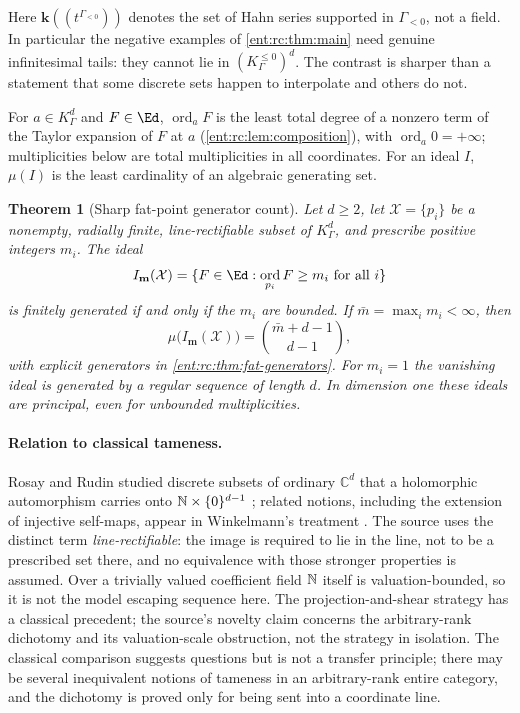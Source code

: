 \documentclass[11pt]{article}
\newtheorem{theorem}{Theorem}[section]
\theoremstyle{plain}
\theoremstyle{plain}
\theoremstyle{plain}
\theoremstyle{definition}
\theoremstyle{definition}
\theoremstyle{definition}
\theoremstyle{definition}
\theoremstyle{remark}
\newcommand{\C}{\mathbb C}\newcommand{\R}{\mathbb R}
\newcommand{\K}{K_\Gamma}\newcommand{\KD}{K_\Delta}
\DeclareMathOperator{\ord}{ord}\DeclareMathOperator{\cf}{cf}
\newcommand{\kk}{\mathbf k}\newcommand{\PP}{\mathbb P}
\newcommand{\Kle}{K_\Gamma^{\le0}}\DeclareMathOperator{\Jac}{Jac}
\begin{document}
Here $\kk((t^{\Gamma_{<0}}))$ denotes the set of Hahn series supported in
$\Gamma_{<0}$, not a field. In particular the negative examples of
\cref{ent:rc:thm:main} need genuine infinitesimal tails: they cannot lie in
$(\Kle)^d$. The contrast is sharper than a statement that some discrete sets
happen to interpolate and others do not.

For $a\in\K^d$ and $F\in\Ed$, $\ord_aF$ is the least total degree of a
nonzero term of the Taylor expansion of $F$ at $a$
(\cref{ent:rc:lem:composition}), with $\ord_a0=+\infty$; multiplicities below
are total multiplicities in all coordinates. For an ideal $I$, $\mu(I)$ is the
least cardinality of an algebraic generating set.

\begin{theorem}[Sharp fat-point generator count]\label{ent:rc:thm:fat-main}
Let $d\ge2$, let $\mathcal X=\{p_i\}$ be a nonempty, radially finite,
line-rectifiable subset of $\K^d$, and prescribe positive integers $m_i$.
The ideal
\[
 I_{\mathbf m}(\mathcal X)=\{F\in\Ed:\ord_{p_i}F\ge m_i\text{ for all }i\}
\]
is finitely generated if and only if the $m_i$ are bounded. If
$\bar m=\max_im_i<\infty$, then
\begin{equation}\label{ent:rc:eq:mu-main}
 \mu\bigl(I_{\mathbf m}(\mathcal X)\bigr)=\binom{\bar m+d-1}{d-1},
\end{equation}
with explicit generators in \cref{ent:rc:thm:fat-generators}. For $m_i=1$
the vanishing ideal is generated by a regular sequence of length $d$. In
dimension one these ideals are principal, even for unbounded multiplicities.
\end{theorem}

\paragraph{Relation to classical tameness.}
Rosay and Rudin studied discrete subsets of ordinary $\C^d$ that a
holomorphic automorphism carries onto $\mathbb N\times\{0\}^{d-1}$
\cite{RosayRudin}; related notions, including the extension of injective
self-maps, appear in Winkelmann's treatment \cite{Winkelmann}. The source
uses the distinct term \emph{line-rectifiable}: the image is required to lie
in the line, not to be a prescribed set there, and no equivalence with those
stronger properties is assumed. Over a trivially valued coefficient field
$\mathbb N$ itself is valuation-bounded, so it is not the model escaping sequence
here. The projection-and-shear strategy has a classical precedent; the
source's novelty claim concerns the arbitrary-rank dichotomy and its
valuation-scale obstruction, not the strategy in isolation. The classical
comparison suggests questions but is not a transfer principle; there may be
several inequivalent notions of tameness in an arbitrary-rank entire
category, and the dichotomy is proved only for being sent into a coordinate
line.
\end{document}
